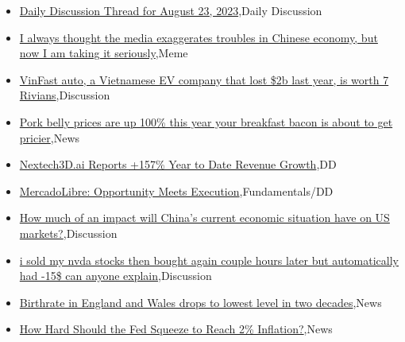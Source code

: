 \documentclass{article}%
\begin{document}
%
\begin{itemize}%
\item%
\href{https://reddit.com/r/wallstreetbets/comments/15yzcyg/daily\_discussion\_thread\_for\_august\_23\_2023/}{Daily Discussion Thread for August 23, 2023},Daily Discussion%
\item%
\href{https://reddit.com/r/wallstreetbets/comments/15yv572/i\_always\_thought\_the\_media\_exaggerates\_troubles/}{I always thought the media exaggerates troubles in Chinese economy, but now I am taking it seriously},Meme%
\item%
\href{https://reddit.com/r/wallstreetbets/comments/15yrd1f/vinfast\_auto\_a\_vietnamese\_ev\_company\_that\_lost\_2b/}{VinFast auto, a Vietnamese EV company that lost \$2b last year, is worth 7 Rivians},Discussion%
\item%
\href{https://reddit.com/r/wallstreetbets/comments/15yqqkm/pork\_belly\_prices\_are\_up\_100\_this\_year\_your/}{Pork belly prices are up 100\% this year  your breakfast bacon is about to get pricier},News%
\item%
\href{https://reddit.com/r/Baystreetbets/comments/15yidjh/nextech3dai\_reports\_157\_year\_to\_date\_revenue/}{Nextech3D.ai Reports +157\% Year to Date Revenue Growth},DD%
\item%
\href{https://reddit.com/r/StockMarket/comments/15z2mzb/mercadolibre\_opportunity\_meets\_execution/}{MercadoLibre: Opportunity Meets Execution},Fundamentals/DD%
\item%
\href{https://reddit.com/r/StockMarket/comments/15yddrh/how\_much\_of\_an\_impact\_will\_chinas\_current/}{How much of an impact will China's current economic situation have on US markets?},Discussion%
\item%
\href{https://reddit.com/r/StockMarket/comments/15yb7bp/i\_sold\_my\_nvda\_stocks\_then\_bought\_again\_couple/}{i sold my nvda stocks then bought again couple hours later but automatically had -15\$ can anyone explain},Discussion%
\item%
\href{https://reddit.com/r/Economics/comments/15ymajf/birthrate\_in\_england\_and\_wales\_drops\_to\_lowest/}{Birthrate in England and Wales drops to lowest level in two decades},News%
\item%
\href{https://reddit.com/r/Economics/comments/15yjsv0/how\_hard\_should\_the\_fed\_squeeze\_to\_reach\_2/}{How Hard Should the Fed Squeeze to Reach 2\% Inflation?},News%
\end{itemize}%
\end{document}
